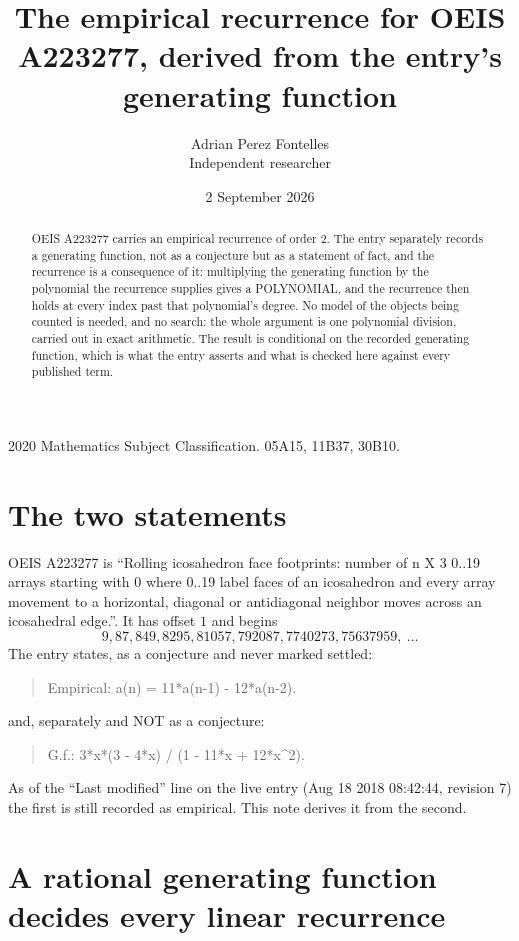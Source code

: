 \documentclass[11pt,a4paper]{article}
\title{The empirical recurrence for OEIS A223277, derived from the entry's generating function}
\author{Adrian Perez Fontelles\\ \small Independent researcher}
\date{2 September 2026}
\theoremstyle{plain}
\theoremstyle{definition}
\begin{document}
\maketitle

\begin{abstract}
OEIS A223277 carries an empirical recurrence of order $2$. The entry separately records a
generating function, not as a conjecture but as a statement of fact, and the recurrence is a
consequence of it: multiplying the generating function by the polynomial the recurrence
supplies gives a POLYNOMIAL, and the recurrence then holds at every index past that
polynomial's degree. No model of the objects being counted is needed, and no search: the
whole argument is one polynomial division, carried out in exact arithmetic. The result is
conditional on the recorded generating function, which is what the entry asserts and what is
checked here against every published term.
\end{abstract}

\noindent\small 2020 Mathematics Subject Classification. 05A15, 11B37, 30B10.\normalsize

\section{The two statements}

OEIS A223277 is ``Rolling icosahedron face footprints: number of n X 3 0..19 arrays starting with 0 where 0..19 label faces of an icosahedron and every array movement to a horizontal, diagonal or antidiagonal neighbor moves across an icosahedral edge.''. It has offset $1$ and begins
\[
9, 87, 849, 8295, 81057, 792087, 7740273, 75637959,\ \dots
\]
The entry states, as a conjecture and never marked settled:
\begin{quote}
Empirical: a(n) = 11*a(n-1) - 12*a(n-2).
\end{quote}
and, separately and NOT as a conjecture:
\begin{quote}
G.f.: 3*x*(3 - 4*x) / (1 - 11*x + 12*x\^{}2).
\end{quote}
As of the ``Last modified'' line on the live entry (Aug 18 2018 08:42:44, revision 7) the first is still
recorded as empirical. This note derives it from the second.

\section{A rational generating function decides every linear recurrence}
\end{document}

